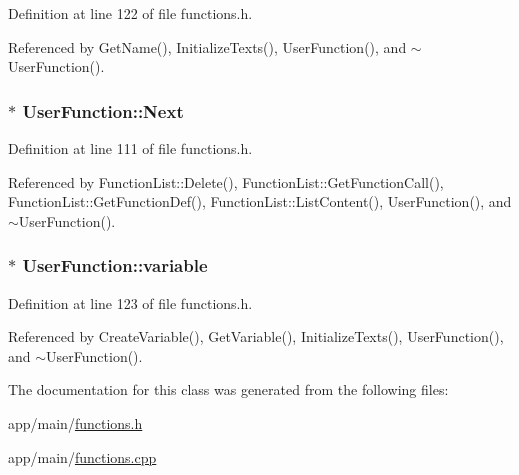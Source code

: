 Definition at line 122 of file functions.\+h.



Referenced by Get\+Name(), Initialize\+Texts(), User\+Function(), and $\sim$\+User\+Function().

\subsubsection[{\texorpdfstring{Next}{Next}}]{$\ast$ User\+Function\+::\+Next}\hypertarget{classUserFunction_a5463f575d2ed50c0dbe069ec2841a5c9}{}\label{classUserFunction_a5463f575d2ed50c0dbe069ec2841a5c9}


Definition at line 111 of file functions.\+h.



Referenced by Function\+List\+::\+Delete(), Function\+List\+::\+Get\+Function\+Call(), Function\+List\+::\+Get\+Function\+Def(), Function\+List\+::\+List\+Content(), User\+Function(), and $\sim$\+User\+Function().

\subsubsection[{\texorpdfstring{variable}{variable}}]{$\ast$ User\+Function\+::variable\hspace{0.3cm}{\ttfamily [private]}}\hypertarget{classUserFunction_a43e22a8c48e1d4770b0c4eadc3254aa8}{}\label{classUserFunction_a43e22a8c48e1d4770b0c4eadc3254aa8}


Definition at line 123 of file functions.\+h.



Referenced by Create\+Variable(), Get\+Variable(), Initialize\+Texts(), User\+Function(), and $\sim$\+User\+Function().



The documentation for this class was generated from the following files\+:\begin{DoxyCompactItemize}
\item 
app/main/\hyperlink{functions_8h}{functions.\+h}\item 
app/main/\hyperlink{functions_8cpp}{functions.\+cpp}\end{DoxyCompactItemize}
